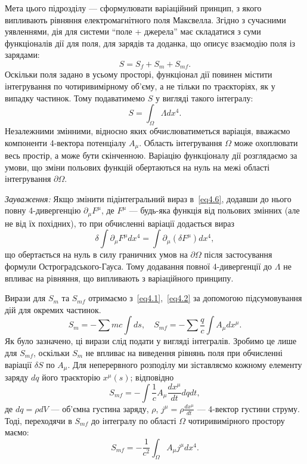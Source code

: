 Мета цього підрозділу --- сформулювати варіаційний принцип, з якого випливають рівняння електромагнітного поля Максвелла. Згідно з сучасними уявленнями, дія для системи “поле + джерела” має складатися з суми функціоналів дії для поля, для зарядів та доданка, що описує взаємодію поля із зарядами:
\begin{equation}\label{eq4.5}
S = S_f + S_m + S_{mf}.
\end{equation}
Оскільки поля задано в усьому просторі, функціонал дії повинен містити інтегрування по чотиривимірному об'єму, а не тільки по траєкторіях, як у випадку частинок. Тому подаватимемо $S$ у вигляді такого інтегралу:
\begin{equation}\label{eq4.6}
S = \int_{\Omega} \Lambda dx^4.
\end{equation}
Незалежними змінними, відносно яких обчислюватиметься варіація, вважаємо компоненти 4-вектора потенціалу $A_\mu$. Область інтегрування $\Omega$ може охоплювати весь простір, а може бути скінченною. Варіацію функціоналу дії розглядаємо за умови, що зміни польових функцій обертаються на нуль на межі області інтегрування $\partial\Omega$.

\textit{Зауваження:} Якщо змінити підінтегральний вираз в~\eqref{eq4.6}, додавши до нього повну 4-дивергенцію $\partial_\mu F^\mu$, де $F^\mu$ --- будь-яка функція від польових змінних (але не від їх похідних), то при обчисленні варіації додається вираз
\begin{equation*}
\delta \int \partial_\mu F^\mu dx^4 = \int \partial_\mu (\delta F^\mu) dx^4,
\end{equation*}
що обертається на нуль в силу граничних умов на $\partial\Omega$ після застосування формули Остроградського-Гауса. Тому додавання повної 4-дивергенції до $\Lambda$ не впливає на рівняння, що випливають з варіаційного принципу.

Вирази для $S_m$ та $S_{mf}$ отримаємо з~\eqref{eq4.1},~\eqref{eq4.2} за допомогою підсумовування дій для окремих частинок.
\begin{equation}\label{eq4.7}
S_m = -\sum mc \int ds, \quad S_{mf} = -\sum \frac{q}{c} \int A_\mu dx^\mu.
\end{equation}
Як було зазначено, ці вирази слід подати у вигляді інтегралів. Зробимо це лише для $S_{mf}$, оскільки $S_m$ не впливає на виведення рівнянь поля при обчисленні варіації $\delta S$ по $A_\mu$. Для неперервного розподілу ми зіставляємо кожному елементу заряду $dq$ його траєкторію $x^\mu(s)$; відповідно
\begin{equation*}
S_{mf} = -\int \frac{1}{c} A_\mu \frac{dx^\mu}{dt} dq dt,
\end{equation*}
де $dq = \rho dV$ --- об'ємна густина заряду, $\rho$, $j^\mu = \rho \frac{dx^\mu}{dt}$ --- 4-вектор густини струму. Тоді, переходячи в $S_{mf}$ до інтегралу по області $\Omega$ чотиривимірного простору маємо:
\begin{equation}\label{eq4.8}
S_{mf} = -\frac{1}{c^2} \int_{\Omega} A_\mu j^\mu dx^4.
\end{equation}

